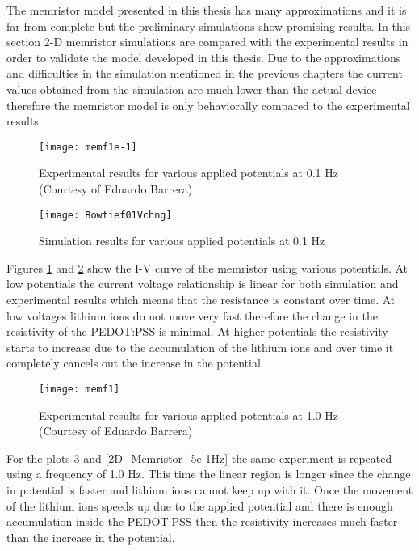 \begin{doublespace}
The memristor model presented in this thesis has many approximations and it is far from complete but the preliminary simulations show promising results. In this section 2-D memristor simulations are compared with the experimental results in order to validate the model developed in this thesis. Due to the approximations and difficulties in the simulation mentioned in the previous chapters the current values obtained from the simulation are much lower than the actual device therefore the memristor model is only behaviorally compared to the experimental results. 


\begin{figure}[!htp]
\centering
\texttt{[image: memf1e-1]}
\caption{Experimental results for various applied potentials at 0.1 Hz (Courtesy of Eduardo Barrera)\cite{eduardo}} 
\label{memf1e-1}
\end{figure}

\begin{figure}[!htp]
\centering
\texttt{[image: Bowtief01Vchng]}
\caption{Simulation results for various applied potentials at 0.1 Hz} 
\label{Bowtief01Vchng}
\end{figure}

Figures \ref{memf1e-1} and \ref{Bowtief01Vchng} show the I-V curve of the memristor using various potentials. At low potentials the current voltage relationship is linear for both simulation and experimental results which means that the resistance is constant over time. At low voltages lithium ions do not move very fast therefore the change in the resistivity of the PEDOT:PSS is minimal. At higher potentials the resistivity starts to increase due to the accumulation of the lithium ions and over time it completely cancels out the increase in the potential. 

\begin{figure}[!htp]
\centering
\texttt{[image: memf1]}
\caption{Experimental results for various applied potentials at 1.0 Hz (Courtesy of Eduardo Barrera)\cite{eduardo}} 
\label{memf1}
\end{figure}

For the plots \ref{memf1} and \ref{2D_Memristor_5e-1Hz} the same experiment is repeated using a frequency of 1.0 Hz. This time the linear region is longer since the change in potential is faster and lithium ions cannot keep up with it. Once the movement of the lithium ions speeds up due to the applied potential and there is enough accumulation inside the PEDOT:PSS then the resistivity increases much faster than the increase in the potential. 


\end{doublespace}
